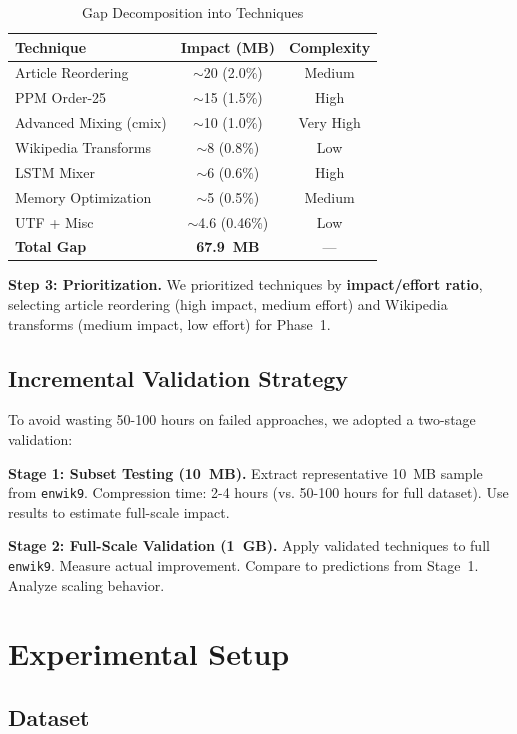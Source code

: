 \documentclass[conference]{IEEEtran}
\newcommand{\enwik}{{\tt enwik9}}
\begin{document}
\begin{table}[htbp]
\caption{Gap Decomposition into Techniques}
\label{tab:gap_breakdown}
\centering
\begin{tabular}{lcc}
\toprule
\textbf{Technique} & \textbf{Impact (MB)} & \textbf{Complexity} \\
\midrule
Article Reordering & $\sim$20 (2.0\%) & Medium \\
PPM Order-25 & $\sim$15 (1.5\%) & High \\
Advanced Mixing (cmix) & $\sim$10 (1.0\%) & Very High \\
Wikipedia Transforms & $\sim$8 (0.8\%) & Low \\
LSTM Mixer & $\sim$6 (0.6\%) & High \\
Memory Optimization & $\sim$5 (0.5\%) & Medium \\
UTF + Misc & $\sim$4.6 (0.46\%) & Low \\
\midrule
\textbf{Total Gap} & \textbf{67.9~MB} & --- \\
\bottomrule
\end{tabular}
\end{table}

\textbf{Step 3: Prioritization.} We prioritized techniques by \textbf{impact/effort ratio}, selecting article reordering (high impact, medium effort) and Wikipedia transforms (medium impact, low effort) for Phase~1.

\subsection{Incremental Validation Strategy}

To avoid wasting 50-100 hours on failed approaches, we adopted a two-stage validation:

\textbf{Stage 1: Subset Testing (10~MB).} Extract representative 10~MB sample from \enwik. Compression time: 2-4 hours (vs. 50-100 hours for full dataset). Use results to estimate full-scale impact.

\textbf{Stage 2: Full-Scale Validation (1~GB).} Apply validated techniques to full \enwik. Measure actual improvement. Compare to predictions from Stage~1. Analyze scaling behavior.

\section{Experimental Setup}

\subsection{Dataset}
\end{document}
